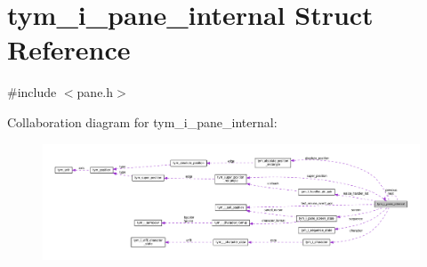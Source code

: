 \hypertarget{structtym__i__pane__internal}{}\section{tym\+\_\+i\+\_\+pane\+\_\+internal Struct Reference}
\label{structtym__i__pane__internal}


{\ttfamily \#include $<$pane.\+h$>$}



Collaboration diagram for tym\+\_\+i\+\_\+pane\+\_\+internal\+:
\nopagebreak
\begin{figure}[H]
\begin{center}
\leavevmode
\includegraphics[width=350pt]{structtym__i__pane__internal__coll__graph}
\end{center}
\end{figure}
